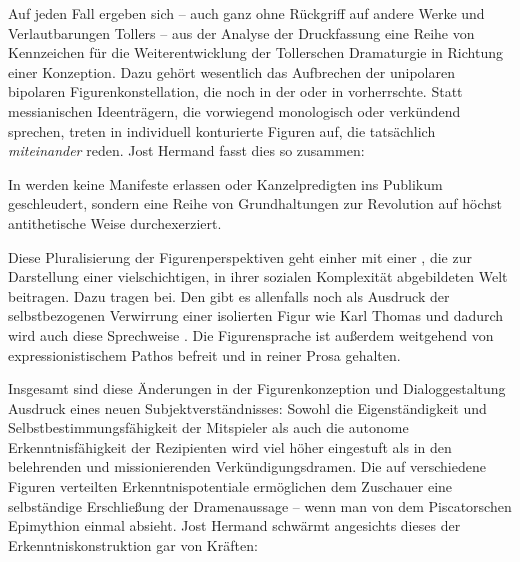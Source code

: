 Auf jeden Fall ergeben sich -- auch ganz ohne Rückgriff auf andere Werke und
Verlautbarungen Tollers -- aus der Analyse der Druckfassung eine Reihe von
Kennzeichen für die Weiterentwicklung der Tollerschen Dramaturgie in Richtung
einer  Konzeption. Dazu gehört wesentlich das Aufbrechen der
unipolaren  bipolaren Figurenkonstellation, die noch in der
 oder in  vorherrschte. Statt
messianischen Ideenträgern, die vorwiegend monologisch oder verkündend
sprechen, treten in  individuell konturierte Figuren
auf, die tatsächlich \emph{miteinander} reden. Jost Hermand fasst dies so
zusammen: 

\begin{BlockQuote}
In  werden keine
Manifeste erlassen oder Kanzelpredigten ins Publikum geschleudert, sondern
eine Reihe von Grundhaltungen zur Revolution auf höchst antithetische Weise
 durchexerziert.
\end{BlockQuote}
Diese Pluralisierung der Figurenperspektiven geht einher mit einer
\Cite{ungewöhnlich hohe[n] Anzahl differenzierter Haupt- und
  Nebenpersonen}, die zur Darstellung einer
vielschichtigen, in ihrer sozialen Komplexität abgebildeten Welt beitragen. 
Dazu tragen \Cite{realistische
  Partnerdialoge} bei.
Den \Cite{visionären Monolog} gibt es allenfalls noch als Ausdruck der
selbstbezogenen Verwirrung einer isolierten Figur wie Karl
Thomas
und dadurch wird auch diese Sprechweise \Cite{Instrument des
  Realismus}.
Die Figurensprache ist außerdem weitgehend von expressionistischem Pathos
befreit und in reiner Prosa gehalten.
 
Insgesamt sind diese Änderungen in der Figurenkonzeption und Dialoggestaltung
Ausdruck eines neuen Subjektverständnisses: Sowohl die Eigenständigkeit und
Selbstbestimmungsfähigkeit der Mitspieler als auch die autonome
Erkenntnisfähigkeit der Rezipienten wird viel höher eingestuft als in den
belehrenden und missionierenden Verkündigungsdramen. Die auf verschiedene
Figuren verteilten Erkenntnispotentiale ermöglichen dem Zuschauer eine
selbständige Erschließung der Dramenaussage -- wenn man von dem Piscatorschen
Epimythion einmal absieht. Jost Hermand schwärmt angesichts dieses
 der Erkenntniskonstruktion gar von
\Cite{dialektischen} Kräften: 

